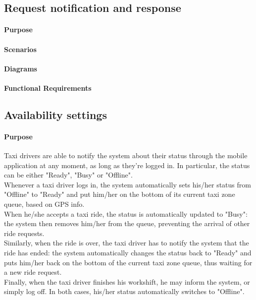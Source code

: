 \subsection{Request notification and response}

\paragraph{Purpose}

\paragraph{Scenarios}

\paragraph{Diagrams}

\paragraph{Functional Requirements}

\subsection{Availability settings}

\paragraph{Purpose}
Taxi drivers are able to notify the system about their status through the mobile application at any moment, as long as they're logged in. In particular, the status can be either "Ready", "Busy" or "Offline".\\
Whenever a taxi driver logs in, the system automatically sets his/her status from "Offline" to "Ready" and put him/her on the bottom of its current taxi zone queue, based on GPS info.\\
When he/she accepts a taxi ride, the status is automatically updated to "Busy": the system then removes him/her from the queue, preventing the arrival of other ride requests.\\
Similarly, when the ride is over, the taxi driver has to notify the system that the ride has ended: the system automatically changes the status back to "Ready" and puts him/her back on the bottom of the current taxi zone queue, thus waiting for a new ride request.\\
Finally, when the taxi driver finishes his workshift, he may inform the system, or simply log off. In both cases, his/her status automatically switches to "Offline".

